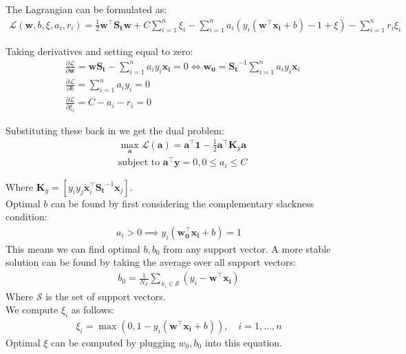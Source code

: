 \documentclass[12pt,twoside]{article}
\begin{document}
The Lagrangian can be formulated as:
\begin{align}
    \mathcal{L}(\mathbf{w}, b, \xi, a_i, r_i) = \frac{1}{2} \mathbf{w^{\top} S_t w} + C \sum_{i=1}^{n} \xi_i - \sum^n_{i=1}a_i (y_i(\mathbf{w^{\top} x_i} + b) - 1 + \xi) -\sum_{i=1}^n r_i\xi_i
\end{align}

Taking derivatives and setting equal to zero:
\begin{align}
     & \frac{\partial \mathcal{L}}{\partial \mathbf{w}} = \mathbf{w S_t} -  \sum^n_{i=1} a_i y_i \mathbf{x_i} = 0 \iff \mathbf{w_0} = \mathbf{S_t}^{-1}  \sum^n_{i=1} a_i y_i \mathbf{x}_i
     \\
     & \frac{\partial \mathcal{L}}{\partial b} = \sum^n_{i=1} a_i y_i = 0
     \\
     & \frac{\partial \mathcal{L}}{\partial \xi_i} = C - a_i - r_i = 0
\end{align}

Substituting these back in we get the dual problem:
\begin{align}
    & \max_\mathbf{a} \mathcal{L} (\mathbf{a}) = \mathbf{a^\top 1} - \frac{1}{2} \mathbf{a^\top K}_y \mathbf{a}
    \\
    & \text{subject to } \mathbf{a} ^\top \mathbf{y} = 0, 0 \leq a_i \leq C
\end{align}

Where $\mathbf{K}_y = [y_i y_j \mathbf{x}_i^\top \mathbf{S_t}^{-1} \mathbf{x}_j]$. \\

Optimal $b$ can be found by first considering the complementary slackness condition:
\begin{align}
    a_i > 0 \implies y_i(\mathbf{w_0^\top x_i} + b) = 1
\end{align}
This means we can find optimal $b, b_0$ from any support vector. A more stable solution can be found by taking the average over all support vectors:
\begin{align}
    b_0 = \frac{1}{N_\mathcal{S}} \sum_{x_i \in \mathcal{S}} (y_i - \mathbf{w^\top x_i})
\end{align}
Where $\mathcal{S}$ is the set of support vectors.
\\

We compute $\xi_i$ as follows:
\begin{align}
    \xi_i = \operatorname{max} (0, 1-y_i(\mathbf{w^\top x_i} + b) ), \quad i = 1 ,..., n
\end{align}
Optimal $\xi$ can be computed by plugging $w_0, b_0$ into this equation.
\end{document}
